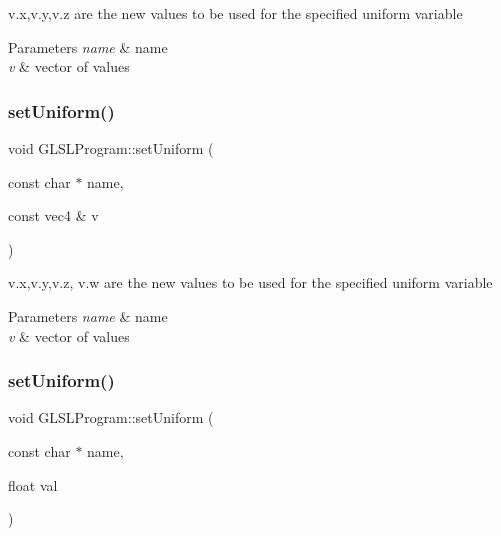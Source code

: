 v.\+x,v.\+y,v.\+z are the new values to be used for the specified uniform variable 


\begin{DoxyParams}{Parameters}
{\em name} & name \\
\hline
{\em v} & vector of values \\
\hline
\end{DoxyParams}
\hypertarget{class_g_l_s_l_program_aadf3691c119baac516735b0d01b85f7e}{}\label{class_g_l_s_l_program_aadf3691c119baac516735b0d01b85f7e} 
\subsubsection{\texorpdfstring{set\+Uniform()}{setUniform()}\hspace{0.1cm}{\footnotesize\ttfamily [3/8]}}
{\footnotesize\ttfamily void G\+L\+S\+L\+Program\+::set\+Uniform (\begin{DoxyParamCaption}\item[{const char $\ast$}]{name,  }\item[{const vec4 \&}]{v }\end{DoxyParamCaption})}



v.\+x,v.\+y,v.\+z, v.\+w are the new values to be used for the specified uniform variable 


\begin{DoxyParams}{Parameters}
{\em name} & name \\
\hline
{\em v} & vector of values \\
\hline
\end{DoxyParams}
\hypertarget{class_g_l_s_l_program_aae087de52f91a47ac23c9f6ebf369bc3}{}\label{class_g_l_s_l_program_aae087de52f91a47ac23c9f6ebf369bc3} 
\subsubsection{\texorpdfstring{set\+Uniform()}{setUniform()}\hspace{0.1cm}{\footnotesize\ttfamily [4/8]}}
{\footnotesize\ttfamily void G\+L\+S\+L\+Program\+::set\+Uniform (\begin{DoxyParamCaption}\item[{const char $\ast$}]{name,  }\item[{float}]{val }\end{DoxyParamCaption})}



